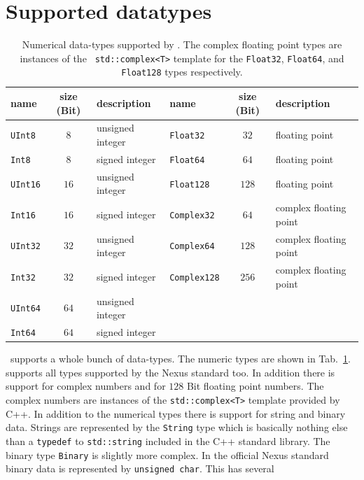 \section{Supported datatypes}
\begin{table}[tb]
\centering
\begin{tabular}{l|c|l||l|c|l}
 name & size (Bit) & description & name & size (Bit) & description \\
 \hline
 {\tt UInt8} & $8$ & unsigned integer & {\tt Float32} & $32$ & floating point \\
 {\tt Int8}  & $8$ & signed integer &   {\tt Float64} & $64$ & floating point \\
 {\tt UInt16} & $16$ & unsigned integer & {\tt Float128} & $128$ & floating
 point\\
 {\tt Int16} & $16$ & signed integer & {\tt Complex32} & $64$ & complex floating
 point \\
 {\tt UInt32} & $32$ & unsigned integer & {\tt Complex64} & $128$ & complex
 floating point \\
 {\tt Int32} & $32$ & signed integer & {\tt Complex128} & $256$ & complex
 floating point \\
 {\tt UInt64} & $64$ & unsigned integer & & & \\
 {\tt Int64} & $64$ & signed integer & & & \\
\hline
\end{tabular}
\caption{{\small\label{tab:numeric_types} Numerical data-types supported by
\pninx. The complex floating point types are instances of the {\tt
std::complex<T>} template for the  {\tt Float32}, {\tt Float64}, and {\tt
Float128} types respectively.}}
\end{table}
\pninx\ supports a whole bunch of data-types. The numeric types are shown in 
Tab.~\ref{tab:numeric_types}. \pninx supports all types supported by the Nexus
standard too. In addition there is support for complex numbers and for $128$ Bit
floating point numbers. The complex numbers are instances of the 
{\tt std::complex<T>} template provided by C++.
In addition to the numerical types there is support for string and binary data. 
Strings are represented by the {\tt String} type which is basically nothing else
than a {\tt typedef} to {\tt std::string} included in the C++ standard library.
The binary type {\tt Binary} is slightly more complex. In the official Nexus
standard binary data is represented by {\tt unsigned char}. This has several 
